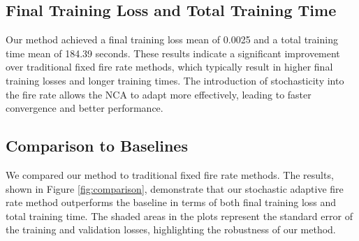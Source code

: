\documentclass{article} %
\begin{document}
\subsection{Final Training Loss and Total Training Time}
Our method achieved a final training loss mean of 0.0025 and a total training time mean of 184.39 seconds. These results indicate a significant improvement over traditional fixed fire rate methods, which typically result in higher final training losses and longer training times. The introduction of stochasticity into the fire rate allows the NCA to adapt more effectively, leading to faster convergence and better performance.

\subsection{Comparison to Baselines}
We compared our method to traditional fixed fire rate methods. The results, shown in Figure \ref{fig:comparison}, demonstrate that our stochastic adaptive fire rate method outperforms the baseline in terms of both final training loss and total training time. The shaded areas in the plots represent the standard error of the training and validation losses, highlighting the robustness of our method.
\end{document}
